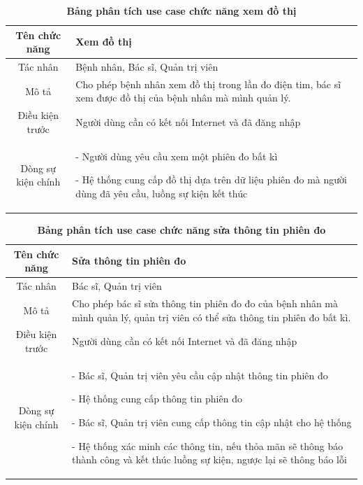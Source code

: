   \begin{table}[H]
    \caption{\bfseries \fontsize{12pt}{0pt}\selectfont Bảng phân tích use case chức năng xem đồ thị}
    \centering
    \begin{tabularx}{0.9\textwidth}{|c|X|}
      \hline
      \textbf{Tên chức năng} & \textbf{Xem đồ thị} \\
      \hline
      Tác nhân & Bệnh nhân, Bác sĩ, Quản trị viên \\
      \hline
      Mô tả & Cho phép bệnh nhân xem đồ thị trong lần đo điện tim, bác sĩ xem được đồ thị của bệnh nhân
      mà mình quản lý.\\
      \hline
      Điều kiện trước & Người dùng cần có kết nối Internet và đã đăng nhập \\
      \hline
      Dòng sự kiện chính & 
        - Người dùng yêu cầu xem một phiên đo bất kì

        - Hệ thống cung cấp đồ thị dựa trên dữ liệu phiên đo mà người dùng đã yêu cầu, luồng sự kiện 
        kết thúc        
        \\
      \hline
    \end{tabularx}
  \end{table}
  \begin{table}[H]
    \caption{\bfseries \fontsize{12pt}{0pt}\selectfont Bảng phân tích use case chức năng sửa thông tin phiên đo}
    \centering
    \begin{tabularx}{0.9\textwidth}{|c|X|}
      \hline
      \textbf{Tên chức năng} & \textbf{Sửa thông tin phiên đo} \\
      \hline
      Tác nhân & Bác sĩ, Quản trị viên \\
      \hline
      Mô tả & Cho phép bác sĩ sửa thông tin phiên đo đo của bệnh nhân
      mà mình quản lý, quản trị viên có thể sửa thông tin phiên đo bất kì.\\
      \hline
      Điều kiện trước & Người dùng cần có kết nối Internet và đã đăng nhập \\
      \hline
      Dòng sự kiện chính & 
        - Bác sĩ, Quản trị viên yêu cầu cập nhật thông tin phiên đo

        - Hệ thống cung cấp thông tin phiên đo

        - Bác sĩ, Quản trị viên cung cấp thông tin cập nhật cho hệ thống

        - Hệ thống xác minh các thông tin, nếu thỏa mãn sẽ thông báo thành công và kết thúc luồng sự kiện, ngược lại 
        sẽ thông báo lỗi          
        \\
      \hline
    \end{tabularx}
  \end{table}

